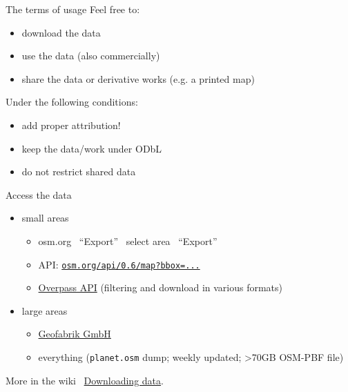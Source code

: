 \documentclass{beamer}
\begin{document}
		\begin{frame}{The terms of usage}
			Feel free to:
			\begin{itemize}
				\item download the data
				\item use the data (also commercially)
				\item share the data or derivative works (e.g. a printed map)
			\end{itemize}
			Under the following conditions:
			\begin{itemize}
				\item add proper attribution!
				\item keep the data/work under ODbL
				\item do not restrict shared data
			\end{itemize}
		\end{frame}
		
		\begin{frame}{Access the data}
			\begin{itemize}
				\item small areas
				\begin{itemize}
					\item osm.org \textrightarrow\ \enquote{Export} \textrightarrow\ select area \textrightarrow\ \enquote{Export}
					\item API: \href{https://www.openstreetmap.org/api/0.6/map?bbox=9.93116,53.59846,9.93572,53.60052}{\texttt{osm.org/api/0.6/map?bbox=...}}
					\item \href{https://overpass-turbo.eu/}{Overpass API} (filtering and download in various formats)
				\end{itemize}\pause
				\item large areas
				\begin{itemize}
					\item \href{https://download.geofabrik.de/}{Geofabrik GmbH}
					\item everything (\texttt{planet.osm} dump; weekly updated; >70GB OSM-PBF file)
				\end{itemize}
			\end{itemize}
			\pause
			\vspace{0.25cm}
			More in the wiki \textrightarrow\ \href{https://wiki.openstreetmap.org/wiki/Downloading\_data}{Downloading data}.
		\end{frame}
		
\end{document}
